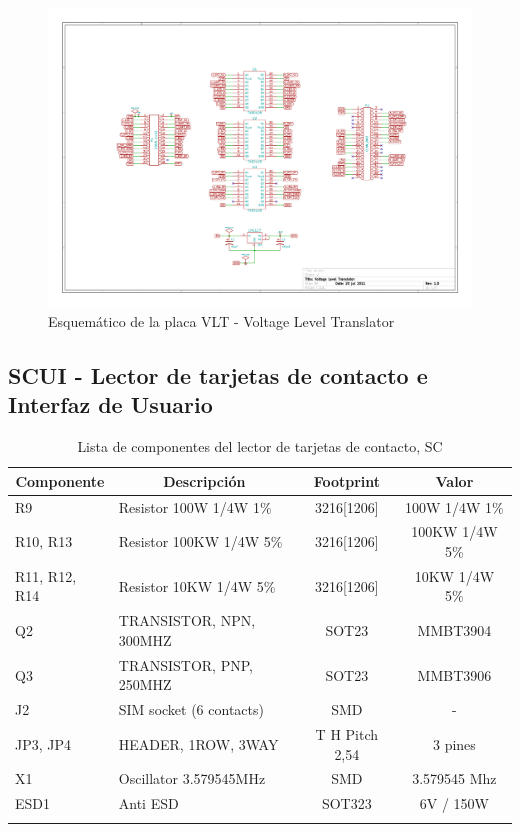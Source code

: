 \begin{figure}[H]
\centering
  \begin{center}
  \includegraphics[angle=90]{Imagenes/vlt.jpg}
  \end{center}
  \caption{Esquemático de la placa VLT - Voltage Level Translator}\label{Fig:VLT} 
\end{figure}

\subsection{SCUI - Lector de tarjetas de contacto e Interfaz de Usuario}
\begin{longtable}{|l|l|c|c|}
\hline
\multicolumn{1}{|c|}{\textbf{Componente}} & \multicolumn{1}{c|}{\textbf{Descripción}} & \textbf{ Footprint} & \textbf{Valor} \\ \hline
R9 & Resistor 100W 1/4W 1\%  & 3216[1206] & 100W 1/4W  1\% \\ \hline
R10, R13 & Resistor 100KW 1/4W 5\%  & 3216[1206] & 100KW 1/4W   5\% \\ \hline
R11, R12, R14 & Resistor 10KW 1/4W 5\%  & 3216[1206] & 10KW 1/4W   5\% \\ \hline
Q2 & TRANSISTOR, NPN, 300MHZ & SOT23 & MMBT3904 \\ \hline
Q3 & TRANSISTOR, PNP, 250MHZ & SOT23 & MMBT3906 \\ \hline
J2 & SIM socket (6 contacts) & SMD & - \\ \hline
JP3, JP4 & HEADER, 1ROW, 3WAY & T H Pitch 2,54 & 3 pines \\ \hline
X1 & Oscillator 3.579545MHz & SMD & 3.579545 Mhz \\ \hline
ESD1 & Anti ESD & SOT323 & 6V / 150W \\ \hline
\caption{Lista de componentes del lector de tarjetas de contacto, SC}
\label{}
\end{longtable}

